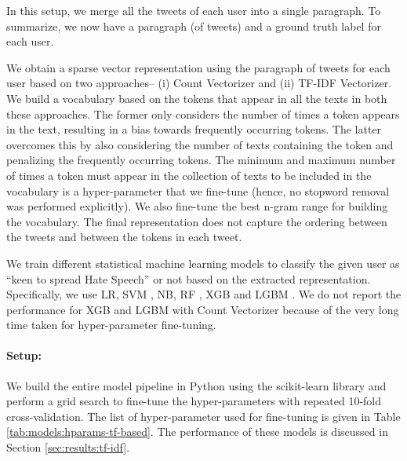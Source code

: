 In this setup, we merge all the tweets of each user into a single paragraph. To summarize, we now have a paragraph (of tweets) and a ground truth label for each user.

We obtain a sparse vector representation using the paragraph of tweets for each user based on two approaches-- (i) Count Vectorizer and (ii) \ac{TF-IDF} Vectorizer. We build a vocabulary based on the tokens that appear in all the texts in both these approaches. The former only considers the number of times a token appears in the text, resulting in a bias towards frequently occurring tokens. The latter overcomes this by also considering the number of texts containing the token and penalizing the frequently occurring tokens. The minimum and maximum number of times a token must appear in the collection of texts to be included in the vocabulary is a hyper-parameter that we fine-tune (hence, no stopword removal was performed explicitly). We also fine-tune the best n-gram range for building the vocabulary. The final representation does not capture the ordering between the tweets and between the tokens in each tweet.

We train different statistical machine learning models to classify the given user as ``keen to spread Hate Speech'' or not based on the extracted representation. Specifically, we use \ac{LR}, \ac{SVM} \cite{svm}, \ac{NB}, \ac{RF} \cite{rf}, \ac{XGB} \cite{xgboost} and \ac{LGBM} \cite{lightgbm}. We do not report the performance for \ac{XGB} and \ac{LGBM} with Count Vectorizer because of the very long time taken for hyper-parameter fine-tuning.

\paragraph{Setup:} We build the entire model pipeline in Python using the scikit-learn \cite{scikit-learn} library and perform a grid search to fine-tune the hyper-parameters with repeated 10-fold cross-validation. The list of hyper-parameter used for fine-tuning is given in Table \ref{tab:models:hparams-tf-based}. The performance of these models is discussed in Section \ref{sec:results:tf-idf}.

